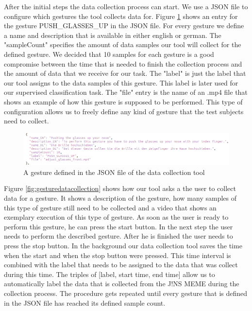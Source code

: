 \documentclass[runningheads]{llncs}
\begin{document}
After the initial steps the data collection process can start. We use a JSON file to configure which gestures the tool collects data for. Figure \ref{fig:gesturejson} shows an entry for the gesture PUSH\_GLASSES\_UP in the JSON file. For every gesture we define a name and description that is available in either english or german. The "sampleCount" specifies the amount of data samples our tool will collect for the defined gesture. We decided that 10 samples for each gesture is a good compromise between the time that is needed to finish the collection process and the amount of data that we receive for our task. The "label" is just the label that our tool assigns to the data samples of this gesture. This label is later used for our supervised classification task. The "file" entry is the name of an .mp4 file that shows an example of how this gesture is supposed to be performed. This type of configuration allows us to freely define any kind of gesture that the test subjects need to collect.
\begin{figure}
\centering
\centerline{\includegraphics[width=\textwidth]{GestureJSON.png}}
\caption{A gesture defined in the JSON file of the data collection tool}
\label{fig:gesturejson}
\end{figure}
Figure \ref{fig:gesturedatacollection} shows how our tool asks a the user to collect data for a gesture. It shows a description of the gesture, how many samples of this type of gesture still need to be collected and a video that shows an exemplary execution of this type of gesture. As soon as the user is ready to perform this gesture, he can press the start button. In the next step the user needs to perform the described gesture. After he is finished the user needs to press the stop button. In the background our data collection tool saves the time when the start and when the stop button were pressed. This time interval is combined with the label that needs to be assigned to the data that was collect during this time. The triples of [label, start time, end time] allow us to automatically label the data that is collected from the J!NS MEME during the collection process. The procedure gets repeated until every gesture that is defined in the JSON file has reached its defined sample count.
\end{document}
